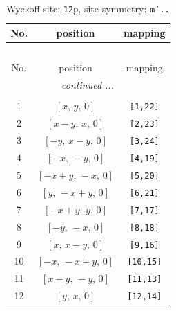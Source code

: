 \documentclass[fleqn,8pt]{jsarticle}
\begin{document}
\begin{longtable}{ccc}
\caption{Wyckoff site: {\tt 12p}, site symmetry: {\tt m'..}}
 \\
 \hline \hline
No. & position & mapping \\ \hline \endfirsthead

\multicolumn{2}{l}{\tablename\ \thetable{}} \\
 \hline \hline
No. & position & mapping \\ \hline \endhead

 \hline \hline
\multicolumn{2}{r}{\footnotesize\it continued ...} \\ \endfoot

 \hline \hline
\multicolumn{2}{r}{} \\ \endlastfoot

1 & $\left[ x,\, y,\, 0 \right]$ & {\tt [1,22]} \\ \hline
2 & $\left[ x - y,\, x,\, 0 \right]$ & {\tt [2,23]} \\ \hline
3 & $\left[ - y,\, x - y,\, 0 \right]$ & {\tt [3,24]} \\ \hline
4 & $\left[ - x,\, - y,\, 0 \right]$ & {\tt [4,19]} \\ \hline
5 & $\left[ - x + y,\, - x,\, 0 \right]$ & {\tt [5,20]} \\ \hline
6 & $\left[ y,\, - x + y,\, 0 \right]$ & {\tt [6,21]} \\ \hline
7 & $\left[ - x + y,\, y,\, 0 \right]$ & {\tt [7,17]} \\ \hline
8 & $\left[ - y,\, - x,\, 0 \right]$ & {\tt [8,18]} \\ \hline
9 & $\left[ x,\, x - y,\, 0 \right]$ & {\tt [9,16]} \\ \hline
10 & $\left[ - x,\, - x + y,\, 0 \right]$ & {\tt [10,15]} \\ \hline
11 & $\left[ x - y,\, - y,\, 0 \right]$ & {\tt [11,13]} \\ \hline
12 & $\left[ y,\, x,\, 0 \right]$ & {\tt [12,14]} \\
\end{longtable}
\renewcommand{\arraystretch}{1.2}
\end{document}
